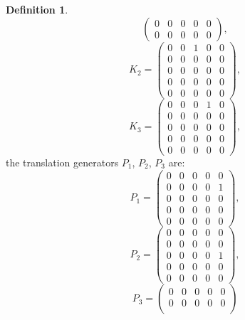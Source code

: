 \documentclass{amsart}
\theoremstyle{definition}
\newtheorem{definition}{Definition}[theorem]
\theoremstyle{remark}
\begin{document}
\begin{definition}
\begin{equation*}
\begin{pmatrix}
    0 & 0 & 0 & 0 & 0 \\
    0 & 0 & 0 & 0 & 0
  \end{pmatrix},
  \end{equation*}
  \begin{equation*}
  K_2 =
  \begin{pmatrix}
    0 & 0 & 1 & 0 & 0 \\
    0 & 0 & 0 & 0 & 0 \\
    0 & 0 & 0 & 0 & 0 \\
    0 & 0 & 0 & 0 & 0 \\
    0 & 0 & 0 & 0 & 0
  \end{pmatrix},
  \end{equation*}
  \begin{equation*}
  K_3 =
  \begin{pmatrix}
    0 & 0 & 0 & 1 & 0 \\
    0 & 0 & 0 & 0 & 0 \\
    0 & 0 & 0 & 0 & 0 \\
    0 & 0 & 0 & 0 & 0 \\
    0 & 0 & 0 & 0 & 0
  \end{pmatrix},
  \end{equation*}
  the translation generators $P_1$, $P_2$, $P_3$ are:
  \begin{equation*}
  P_1 =
  \begin{pmatrix}
    0 & 0 & 0 & 0 & 0 \\
    0 & 0 & 0 & 0 & 1 \\
    0 & 0 & 0 & 0 & 0 \\
    0 & 0 & 0 & 0 & 0 \\
    0 & 0 & 0 & 0 & 0
  \end{pmatrix},
  \end{equation*}
  \begin{equation*}
  P_2 =
  \begin{pmatrix}
    0 & 0 & 0 & 0 & 0 \\
    0 & 0 & 0 & 0 & 0 \\
    0 & 0 & 0 & 0 & 1 \\
    0 & 0 & 0 & 0 & 0 \\
    0 & 0 & 0 & 0 & 0
  \end{pmatrix},
  \end{equation*}
  \begin{equation*}
  P_3 =
  \begin{pmatrix}
    0 & 0 & 0 & 0 & 0 \\
    0 & 0 & 0 & 0 & 0 \\

\end{pmatrix}
\end{equation*}
\end{definition}
\end{document}
